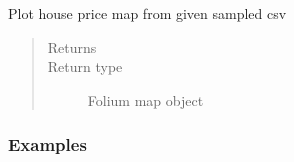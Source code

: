 \documentclass[letterpaper,10pt,english]{sphinxmanual}
\begin{document}
\begin{fulllineitems}
\label{\detokenize{index:flood_tool.plot_house_price_sampled}}
\sphinxAtStartPar
Plot house price map from given sampled csv
\begin{quote}\begin{description}
\item[{Returns}] \leavevmode
\sphinxAtStartPar


\item[{Return type}] \leavevmode
\sphinxAtStartPar
Folium map object

\end{description}\end{quote}
\subsubsection*{Examples}

\begin{sphinxVerbatim}[commandchars=\\\{\}]
  
\end{sphinxVerbatim}

\end{fulllineitems}

\end{document}
